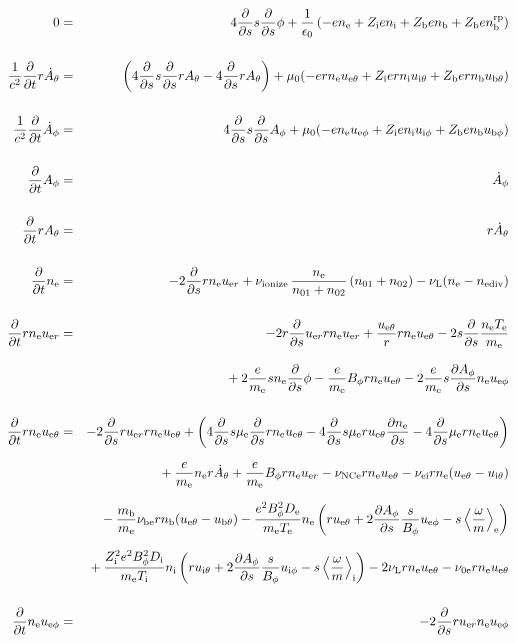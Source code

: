 \documentclass[11pt]{article}
\def\r#1{{\rm#1}}
\def\ddt{\frac{\partial}{\partial t}}
\def\dds{\frac{\partial}{\partial s}}
\def\dd#1{\frac{\partial #1}{\partial s}}
\def\ave#1{\left\langle#1\right\rangle}
\def\me{m_\r{e}}
\def\mb{m_\r{b}}
\def\mue{\mu_\r{e}}
\def\De{D_\r{e}}
\def\Di{D_\r{i}}
\def\ne{n_\r{e}}
\def\ni{n_\r{i}}
\def\nb{n_\r{b}}
\def\uer{u_{\r{e}r}}
\def\ueth{u_{\r{e}\theta}}
\def\uith{u_{\r{i}\theta}}
\def\ubth{u_{\r{b}\theta}}
\def\ueph{u_{\r{e}\phi}}
\def\uiph{u_{\r{i}\phi}}
\def\ubph{u_{\r{b}\phi}}
\def\Bph{B_\phi}
\def\Athd{\dot{A}_\theta}
\def\Aphd{\dot{A}_\phi}
\def\Ath{A_\theta}
\def\Aph{A_\phi}
\def\Te{T_\r{e}}
\def\Ti{T_\r{i}}
\def\nna{n_{01}}
\def\nnb{n_{02}}
\def\Zi{Z_\r{i}}
\def\Zb{Z_\r{b}}
\def\nbrp{n_\r{b}^\r{rp}}
\def\nuNCe{\nu_\r{NCe}}
\def\nune{\nu_\r{0e}}
\def\nuL{\nu_\r{L}}
\def\nuion{\nu_\r{ionize}}
\def\nediv{n_\r{ediv}}
\begin{document}
\begin{eqnarray}
%
% 
  0 &=&
%
    4 \dds s \dds \phi
%
  + \frac{1}{\epsilon_0}
%
    \left(-e \ne + \Zi e \ni + \Zb e \nb + \Zb e \nbrp \right)
\\[5mm]
%
%
  \frac{1}{c^2} \ddt r \Athd &=&
%
    \left(   4 \dds s \dds r \Ath
%
           - 4 \dds r \Ath \right)
%
  + \mu_0 (-e r \ne \ueth + \Zi e r \ni \uith + \Zb e r \nb \ubth)
\\[5mm]
%
%
  \frac{1}{c^2} \ddt \Aphd &=&
%
    4 \dds s \dds \Aph
%
  + \mu_0 (-e \ne \ueph + \Zi e \ni \uiph + \Zb e \nb \ubph)
%
\\[5mm]
%
%
  \ddt \Aph &=&
%
  \Aphd
\\[5mm]
%
%
  \ddt r \Ath &=&
%
  r \Athd
\\[5mm]
%
%
  \ddt \ne &=&
%
  - 2 \dds r \ne \uer 
%
  + \nuion\, \frac{\ne}{\nna+\nnb}\, (\nna+\nnb)
%
  - \nuL (\ne - \nediv)
\\[5mm]
%
%
  \ddt r \ne \uer &=&
%
  - 2 r \dds \uer r \ne \uer
%
  + \frac{\ueth}{r} r \ne \ueth
%
  - 2 s \dds \frac{\ne \Te}{\me}
\nonumber\\[3mm]&&{}
%
  + 2 \frac{e}{\me} s \ne \dds \phi
%
  - \frac{e}{\me} \Bph r \ne \ueth
%
  - 2 \frac{e}{\me} s \dd{\Aph} \ne \ueph
\\[5mm]
%
%
  \ddt r \ne \ueth &=&
%
  - 2 \dds r \uer r \ne \ueth
%
  + \left(    4 \dds s \mue \dds r \ne \ueth
%
            - 4 \dds s \mue r \ueth \dd{\ne}
%
            - 4 \dds \mue r \ne \ueth \right)
\nonumber\\[2.5mm]&&{}
%
  + \frac{e}{\me} \ne r \Athd
%
  + \frac{e}{\me} \Bph r \ne \uer
%
  - \nuNCe r \ne \ueth
%
  - \nu_\r{ei} r \ne (\ueth - \uith)
\nonumber\\[2.5mm]&&{}
%
  - \frac{\mb}{\me} \nu_\r{be} r \nb (\ueth - \ubth)
%
  - \frac{e^2 \Bph^2 \De}{\me\Te}\ne
    \left(r \ueth + 2\dd{\Aph}\frac{s}{\Bph}\ueph - s
     \ave{\frac{\omega}{m}}_\r{e} \right)
\nonumber\\[2.5mm]&&{}
%
   + \frac{\Zi^2 e^2 \Bph^2 \Di}{\me\Ti}\ni
    \left(r \uith + 2\dd{\Aph}\frac{s}{\Bph}\uiph - s
     \ave{\frac{\omega}{m}}_\r{i} \right)
%
  - 2 \nuL r \ne \ueth
%
  - \nune r \ne \ueth
%
%
\\[5mm]
%
%
  \ddt \ne \ueph &=&
%
  - 2 \dds r \uer \ne \ueph

\end{eqnarray}
\end{document}
